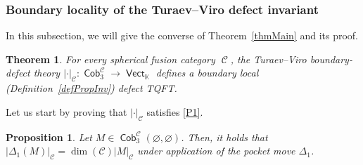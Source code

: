 \documentclass[pdftex]{sigma}
\DeclareMathOperator{\vect}{\mathsf{Vect}}
\DeclareMathOperator{\K}{\mathbb{K}}
\DeclareMathOperator{\Cob}{\mathsf{Cob}}
\DeclareMathOperator{\calc}{\mathcal{C}}
\numberwithin{equation}{section}
\newtheorem{Theorem}{Theorem}[section]
\newtheorem{Proposition}[Proposition]{Proposition}
\theoremstyle{definition}
\begin{document}
\subsubsection{Boundary locality of the Turaev--Viro defect invariant}
\label{subSecProof}
In this subsection, we will give the converse of Theorem~\ref{thmMain} and its proof.
\begin{Theorem}
 \label{thmMainTV}
 For every spherical fusion category $\calc$, the Turaev--Viro boundary-defect theory $| \cdot |_{\calc}\colon \Cob_3^{\calc} \rightarrow \vect_{\K}$ defines a boundary local {\rm (}Definition~{\rm \ref{defPropInv})} defect TQFT.
\end{Theorem}
Let us start by proving that $|\cdot|_{\calc}$ satisfies \ref{P1}.
\begin{Proposition}
 \label{propProp1TV}
 Let $M \in \Cob_3^{\mathcal{C}}(\varnothing, \varnothing)$. Then, it holds that $|\Delta_1(M)|_{\mathcal{C}} = \dim(\mathcal{C})|M|_{\mathcal{C}}$ under application of the pocket move $\Delta_1$.
\end{Proposition}
\end{document}
